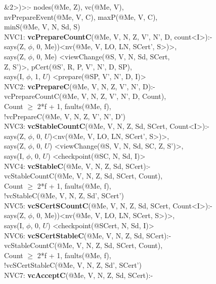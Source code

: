 \begin{code}
\> $\&2$>)>:- nodes(@Me, Z), vc(@Me, V), \\
\> nvPrepareEvent(@Me, V, C), maxP(@Me, V, C), \\
\> minS(@Me, V, N, Sd, S)\\
NVC1: \textbf{vcPrepareCountC}(@Me, V, N, Z, V', N', D, count<I>):-\\
\> says(Z, $\phi$, 0, Me))<nv(@Me, V, LO, LN, SCert', S>)>,\\
\> says(Z, $\phi$, 0, Me) <viewChange(@S, V, N, Sd, SCert, \\
\> Z, S')>, pCert(@S', R, P, V', N', D, SP),\\
\> says(I, $\phi$, 1, $U$) <prepare(@SP, V', N', D, I)>\\
NVC2: \textbf{vcPrepareC}(@Me, V, N, Z, V', N', D):-\\
\> vcPrepareCountC(@Me, V, N, Z, V', N', D, Count),\\
\> Count $\geq$ 2*f + 1, faults(@Me, f),\\
\> !vcPrepareC(@Me, V, N, Z, V', N', D')\\
NVC3: \textbf{vcStableCountC}(@Me, V, N, Z, Sd, SCert, Count<I>):- \\
\> says(Z, $\phi$, 0, $U$)<nv(@Me, V, LO, LN, SCert', S>)>,\\
\> says(Z, $\phi$, 0, $U$) <viewChange(@S, V, N, Sd, SC, Z, S')>,\\
\> says(I, $\phi$, 0, $U$) <checkpoint(@SC, N, Sd, I)>\\
NVC4: \textbf{vcStableC}(@Me, V, N, Z, Sd, SCert):-\\
\> vcStableCountC(@Me, V, N, Z, Sd, SCert, Count),\\
\> Count $\geq$ 2*f + 1, faults(@Me, f),\\
\> !vcStableC(@Me, V, N, Z, Sd', SCert')\\
NVC5: \textbf{vcSCertSCountC}(@Me, V, N, Z, Sd, SCert, Count<I>):- \\
\> says(Z, $\phi$, 0, Me))<nv(@Me, V, LO, LN, SCert, S>)>,\\
\> says(I, $\phi$, 0, $U$) <checkpoint(@SCert, N, Sd, I)>\\
NVC6: \textbf{vcSCertStableC}(@Me, V, N, Z, Sd, SCert):-\\
\> vcStableCountC(@Me, V, N, Z, Sd, SCert, Count),\\
\> Count $\geq$ 2*f + 1, faults(@Me, f),\\
\> !vcSCertStableC(@Me, V, N, Z, Sd', SCert')\\
NVC7: \textbf{vcAcceptC}(@Me, V, N, Z, Sd, SCert):-\\

\end{code}
